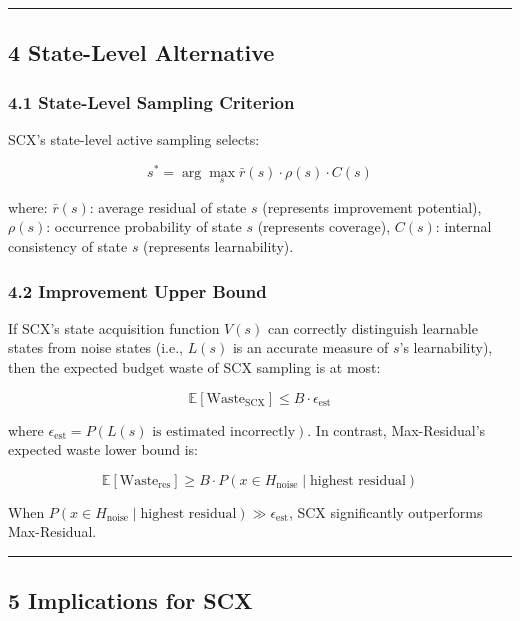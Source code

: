 \documentclass[
  12pt,
]{article}
\begin{document}
\begin{center}\rule{0.5\linewidth}{0.5pt}\end{center}

\subsection{4 State-Level Alternative}\label{state-level-alternative}

\subsubsection{4.1
State-Level Sampling Criterion}\label{state-level-sampling-criterion}

SCX's state-level active sampling selects:

\[s^* = \arg\max_s \bar{r}(s) \cdot \rho(s) \cdot C(s)\]

where: \(\bar{r}(s)\): average residual of state \(s\) (represents improvement potential),
\(\rho(s)\): occurrence probability of state \(s\) (represents coverage), \(C(s)\): internal consistency of state
\(s\) (represents learnability).

\subsubsection{4.2 Improvement Upper Bound}\label{improvement-upper-bound}

If SCX's state acquisition function \(V(s)\) can correctly distinguish learnable states from noise states (i.e.,
\(L(s)\) is an accurate measure of \(s\)'s learnability), then the expected budget waste of SCX
sampling is at most:

\[\mathbb{E}[\text{Waste}_{\text{SCX}}] \leq B \cdot \epsilon_{\text{est}}\]

where
\(\epsilon_{\text{est}} = P(L(s) \text{ is estimated incorrectly})\). In contrast, Max-Residual's
expected waste lower bound is:

\[\mathbb{E}[\text{Waste}_{\text{res}}] \geq B \cdot P(x \in H_{\text{noise}} \mid \text{highest residual})\]

When
\(P(x \in H_{\text{noise}} \mid \text{highest residual}) \gg \epsilon_{\text{est}}\),
SCX significantly outperforms Max-Residual.

\begin{center}\rule{0.5\linewidth}{0.5pt}\end{center}

\subsection{5 Implications for SCX}\label{implications-for-scx}
\end{document}
